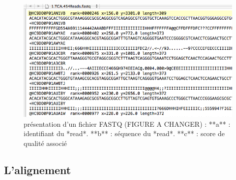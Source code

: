 \documentclass[12pt,twoside]{reedthesis}
\theoremstyle{definition}
\theoremstyle{definition}
\theoremstyle{remark}
\begin{document}
  \begin{figure}
  
  {\centering \includegraphics[scale=.55]{figure/fastq} 
  
  }
  
  \caption[présentation d'un fichier FASTQ (FIGURE A CHANGER)]{présentation d'un fichier FASTQ (FIGURE A CHANGER) : **a** : identifiant du *read*. **b** : séquence du *read*. **c** : score de qualité associé}\label{fig:fastqformat}
  \end{figure}
  
  \newpage
  
  \hypertarget{lalignement}{\subsection{L'alignement}\label{lalignement}}
  
\end{document}
